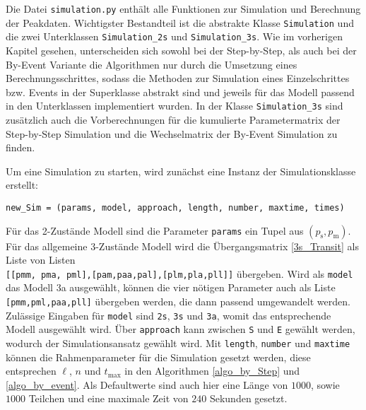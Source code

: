 
Die Datei \texttt{simulation.py} enthält alle Funktionen zur Simulation und Berechnung der Peakdaten. Wichtigster Bestandteil ist die abstrakte Klasse \texttt{Simulation} und die zwei Unterklassen \texttt{Simulation\_2s} und \texttt{Simulation\_3s}. Wie im vorherigen Kapitel gesehen, unterscheiden sich sowohl bei der Step-by-Step, als auch bei der By-Event Variante die Algorithmen nur durch die Umsetzung eines Berechnungsschrittes, sodass die Methoden zur Simulation eines Einzelschrittes bzw. Events in der Superklasse abstrakt sind und jeweils für das Modell passend in den Unterklassen implementiert wurden. In der Klasse \verb!Simulation_3s! sind zusätzlich auch die Vorberechnungen für die kumulierte Parametermatrix der Step-by-Step Simulation und die Wechselmatrix der By-Event Simulation zu finden.

Um eine Simulation zu starten, wird zunächst eine Instanz der Simulationsklasse erstellt:
\begin{verbatim}
new_Sim = (params, model, approach, length, number, maxtime, times)
\end{verbatim}                                                                                                  
Für das 2-Zustände Modell sind die Parameter \verb!params! ein Tupel aus $(p_\text{s}, p_\text{m})$. Für das allgemeine 3-Zustände Modell wird die Übergangsmatrix \ref{3s_Transit} als Liste von Listen \\ \verb![[pmm, pma, pml],[pam,paa,pal],[plm,pla,pll]]! übergeben. Wird als \verb!model! das Modell 3a ausgewählt, können die vier nötigen Parameter auch als Liste \verb![pmm,pml,paa,pll]! übergeben werden, die dann passend umgewandelt werden.
Zulässige Eingaben für \verb!model! sind \texttt{2s}, \texttt{3s} und \texttt{3a}, womit das entsprechende Modell ausgewählt wird. Über \verb!approach! kann zwischen \texttt{S} und \texttt{E} gewählt werden, wodurch der Simulationsansatz gewählt wird.
Mit \verb!length!, \verb!number! und \verb!maxtime! können die Rahmenparameter für die Simulation gesetzt werden, diese entsprechen $\ell$, $n$ und $t_{\text{max}}$ in den Algorithmen \ref{algo_by_Step} und \ref{algo_by_event}. Als Defaultwerte sind auch hier eine Länge von $1000$, sowie $1000$ Teilchen und eine maximale Zeit von $240$ Sekunden gesetzt.

